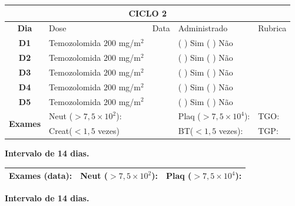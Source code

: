 \documentclass[11pt,a4paper,oldfontcommands]{memoir}
\begin{document}
\begin{center}
\begin{longtable}{p{1cm}p{4cm}|p{1cm}|p{4.6cm}|p{3cm}}
	\hline
	\multicolumn{5}{c}{\textbf{CICLO 2}}\\
\hline
    \multicolumn{1}{c|}{\multirow{1}{*}{\textbf{Dia}}}&{Dose}&{Data}&{Administrado}&{Rubrica} \\
    \hline
    \multicolumn{1}{c|}{\multirow{1}{*}{\textbf{D1}}}&{Temozolomida \(200\) mg/m\(^2\)}&&{(  ) Sim (  ) Não}&\\
    \multicolumn{1}{c|}{\multirow{1}{*}{\textbf{D2}}}&{Temozolomida \(200\) mg/m\(^2\)}&&{(  ) Sim (  ) Não}&\\
    \multicolumn{1}{c|}{\multirow{1}{*}{\textbf{D3}}}&{Temozolomida \(200\) mg/m\(^2\)}&&{(  ) Sim (  ) Não}&\\
    \multicolumn{1}{c|}{\multirow{1}{*}{\textbf{D4}}}&{Temozolomida \(200\) mg/m\(^2\)}&&{(  ) Sim (  ) Não}&\\
    \multicolumn{1}{c|}{\multirow{1}{*}{\textbf{D5}}}&{Temozolomida \(200\) mg/m\(^2\)}&&{(  ) Sim (  ) Não}&\\
    \hline
    \multicolumn{1}{c|}{\multirow{2}{*}{\textbf{Exames}}}&\multicolumn{2}{l|}{Neut (\(>7,5\times10^2\)):}&{Plaq (\(>7,5\times10^4\)):}&{TGO:}\\
    \cline{2-5}
    \multicolumn{1}{c|}{\multirow{2}{*}{{}}}&\multicolumn{2}{l|}{Creat(\(<1,5\) vezes)}&{BT(\(<1,5\) vezes):}&{TGP:}
    \\
    \hline
\end{longtable}
\textbf{Intervalo de 14 dias.}
\begin{longtable}{p{5cm}|p{5cm}|p{4.5cm}}
    \hline
    \textbf{Exames (data):}&{Neut (\(>7,5\times10^2\)):}&{Plaq (\(>7,5\times10^4\)):}
    \\
    \hline
\end{longtable}
\textbf{Intervalo de 14 dias.}
\end{center}
\end{document}
